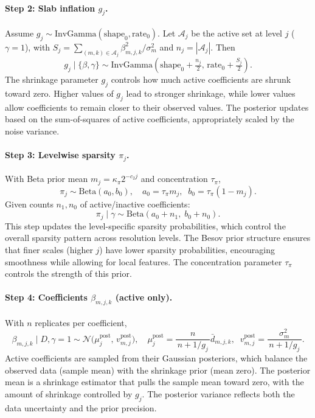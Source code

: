 \documentclass[11pt]{article}
\begin{document}
\paragraph{Step 2: Slab inflation $g_j$.}
Assume $g_j\sim\mathrm{InvGamma}(\text{shape}_0,\text{rate}_0)$. Let $\mathcal{A}_j$ be the active set at level $j$ ($\gamma\!=\!1$), with
$S_j=\sum_{(m,k)\in\mathcal{A}_j}\beta_{m,j,k}^2/\sigma_m^2$ and $n_j=|\mathcal{A}_j|$. Then
\[
g_j \mid \{\beta,\gamma\} \sim \mathrm{InvGamma}\!\left(\text{shape}_0+\tfrac{n_j}{2},\,\text{rate}_0+\tfrac{S_j}{2}\right).
\]
The shrinkage parameter $g_j$ controls how much active coefficients are shrunk toward zero. Higher values of $g_j$ lead to stronger shrinkage, while lower values allow coefficients to remain closer to their observed values. The posterior updates based on the sum-of-squares of active coefficients, appropriately scaled by the noise variance.

\paragraph{Step 3: Levelwise sparsity $\pi_j$.}
With Beta prior mean $m_j=\kappa_\pi 2^{-c_2 j}$ and concentration $\tau_\pi$,
\[
\pi_j \sim \mathrm{Beta}(a_0,b_0),\quad a_0=\tau_\pi m_j,\;\; b_0=\tau_\pi(1-m_j).
\]
Given counts $n_1,n_0$ of active/inactive coefficients:
\[
\pi_j \mid \gamma \sim \mathrm{Beta}(a_0+n_1,\; b_0+n_0).
\]
This step updates the level-specific sparsity probabilities, which control the overall sparsity pattern across resolution levels. The Besov prior structure ensures that finer scales (higher $j$) have lower sparsity probabilities, encouraging smoothness while allowing for local features. The concentration parameter $\tau_\pi$ controls the strength of this prior.

\paragraph{Step 4: Coefficients $\beta_{m,j,k}$ (active only).}
With $n$ replicates per coefficient,
\[
\beta_{m,j,k}\mid D,\gamma\!=\!1
\sim \mathcal{N}\!\big(\mu_{j}^{\text{post}},\, v_{m,j}^{\text{post}}\big),\quad
\mu_{j}^{\text{post}}=\frac{n}{\,n+1/g_j\,}\bar{d}_{m,j,k},\;\;
v_{m,j}^{\text{post}}=\frac{\sigma_m^2}{\,n+1/g_j\,}.
\]
Active coefficients are sampled from their Gaussian posteriors, which balance the observed data (sample mean) with the shrinkage prior (mean zero). The posterior mean is a shrinkage estimator that pulls the sample mean toward zero, with the amount of shrinkage controlled by $g_j$. The posterior variance reflects both the data uncertainty and the prior precision.
\end{document}
